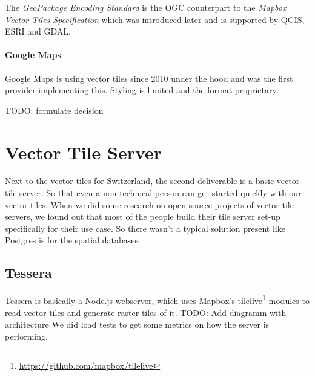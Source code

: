 The \emph{GeoPackage Encoding Standard} is the OGC counterpart to the
\emph{Mapbox Vector Tiles Specification} which was introduced later and
is supported by QGIS, ESRI and GDAL.

\paragraph{Google Maps}

Google Maps is using vector tiles since 2010 under the hood and was the
first provider implementing this. Styling is limited and the format
proprietary.

TODO: formulate decision

\section{Vector Tile Server}
Next to the vector tiles for Switzerland, the second deliverable is a basic vector tile server. So that even a non technical person can get started quickly with our vector tiles.\newline{}
When we did some research on open source projects of vector tile servers, we found out that most of the people build their tile server set-up specifically for their use case. So there wasn't a typical solution present like Postgres is for the spatial databases.

\subsection{Tessera}
Tessera is basically a Node.js webserver, which uses Mapbox's tilelive\footnote{\url{https://github.com/mapbox/tilelive}} modules to read vector tiles and generate raster tiles of it.
TODO: Add diagramm with architecture
We did load tests to get some metrics on how the server is performing.

